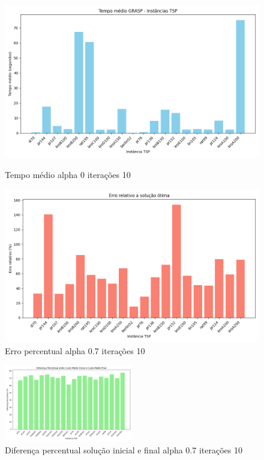 \documentclass[10pt]{extarticle} %
\begin{document}
\begin{figure}[H]
    \centering
        \begin{minipage}{0.5\textwidth}
        \centering
        \includegraphics[width=1\textwidth]{./plots/average_times_saida_07_10.log.png}
        \caption{Tempo médio alpha 0 iterações 10}
        \label{fig:Tempo médio alpha 0 iterações 10}
    \end{minipage}\hfill
    \begin{minipage}{0.5\textwidth}
        \centering
        \includegraphics[width=1.0\textwidth]{./plots/solution_comparison_saida_07_10.log.png}
        \caption{Erro percentual alpha 0.7 iterações 10}
        \label{fig:Erro percentual alpha 0.7 iterações 10}
    \end{minipage}
\end{figure}

\begin{figure}[H]
    \centering
    \includegraphics[width=0.5\textwidth]{./plots/path_difference_saida_07_10.log.png}
    \caption{Diferença percentual solução inicial e final alpha 0.7 iterações 10}
    \label{fig:Diferença percentual solução inicial e final alpha 0.7 iterações 10}
\end{figure}
\end{document}

